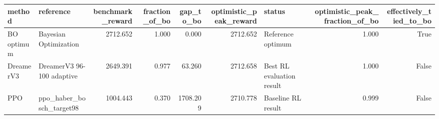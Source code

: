 \begin{tabular}{llrrrrlrr}
\toprule
method & reference & benchmark_reward & fraction_of_bo & gap_to_bo & optimistic_peak_reward & status & optimistic_peak_fraction_of_bo & effectively_tied_to_bo \\
\midrule
BO optimum & Bayesian Optimization & 2712.652 & 1.000 & 0.000 & 2712.652 & Reference optimum & 1.000 & True \\
DreamerV3 & DreamerV3 96-100 adaptive & 2649.391 & 0.977 & 63.260 & 2712.658 & Best RL evaluation result & 1.000 & False \\
PPO & ppo_haber_bosch_target98 & 1004.443 & 0.370 & 1708.209 & 2710.778 & Baseline RL result & 0.999 & False \\
\bottomrule
\end{tabular}
